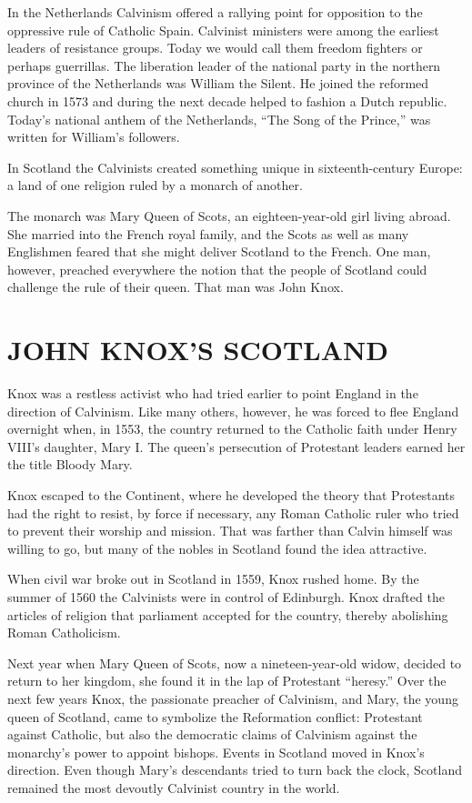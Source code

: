 In the Netherlands Calvinism offered a rallying point for opposition to the oppressive rule of
Catholic Spain. Calvinist ministers were among the earliest leaders of resistance groups. Today we
would call them freedom fighters or perhaps guerrillas. The liberation leader of the national party
in the northern province of the Netherlands was William the Silent. He joined the reformed church in
1573 and during the next decade helped to fashion a Dutch republic. Today’s national anthem of the
Netherlands, “The Song of the Prince,” was written for William’s followers.

In Scotland the Calvinists created something unique in sixteenth-century Europe: a land of one
religion ruled by a monarch of another.

The monarch was Mary Queen of Scots, an eighteen-year-old girl living abroad. She married into the
French royal family, and the Scots as well as many Englishmen feared that she might deliver Scotland
to the French. One man, however, preached everywhere the notion that the people of Scotland could
challenge the rule of their queen. That man was John Knox.

\section{JOHN KNOX’S SCOTLAND}

Knox was a restless activist who had tried earlier to point England in the direction of Calvinism.
Like many others, however, he was forced to flee England overnight when, in 1553, the country
returned to the Catholic faith under Henry VIII’s daughter, Mary I. The queen’s persecution of
Protestant leaders earned her the title Bloody Mary.

Knox escaped to the Continent, where he developed the theory that Protestants had the right to
resist, by force if necessary, any Roman Catholic ruler who tried to prevent their worship and
mission. That was farther than Calvin himself was willing to go, but many of the nobles in Scotland
found the idea attractive.

When civil war broke out in Scotland in 1559, Knox rushed home. By the summer of 1560 the Calvinists
were in control of Edinburgh. Knox drafted the articles of religion that parliament accepted for the
country, thereby abolishing Roman Catholicism.

Next year when Mary Queen of Scots, now a nineteen-year-old widow, decided to return to her kingdom,
she found it in the lap of Protestant “heresy.” Over the next few years Knox, the passionate
preacher of Calvinism, and Mary, the young queen of Scotland, came to symbolize the Reformation
conflict: Protestant against Catholic, but also the democratic claims of Calvinism against the
monarchy’s power to appoint bishops. Events in Scotland moved in Knox’s direction. Even though
Mary’s descendants tried to turn back the clock, Scotland remained the most devoutly Calvinist
country in the world.


